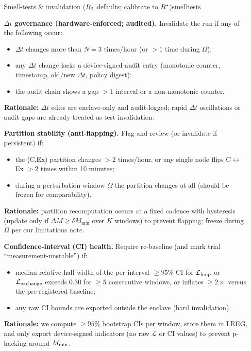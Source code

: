\documentclass[11pt]{article}
\begin{document}
\begin{docbox}{Smell-tests \& invalidation ($R_0$ defaults; calibrate to $R^*$)}{smelltests}

\textbf{$\Delta t$ governance (hardware-enforced; audited).} Invalidate the run if any of the following occur:
\begin{itemize}
\item $\Delta t$ changes more than $N = 3$ times/hour (or $>1$ time during $\Omega$);
\item any $\Delta t$ change lacks a device-signed audit entry (monotonic counter, timestamp, old/new $\Delta t$, policy digest);
\item the audit chain shows a gap $>1$ interval or a non-monotonic counter.
\end{itemize}
\textbf{Rationale:} $\Delta t$ edits are enclave-only and audit-logged; rapid $\Delta t$ oscillations or audit gaps are already treated as test invalidation.

\textbf{Partition stability (anti-flapping).} Flag and review (or invalidate if persistent) if:
\begin{itemize}
\item the (C,Ex) partition changes $>2$ times/hour, or any single node flips C$\leftrightarrow$Ex $>2$ times within 10 minutes;
\item during a perturbation window $\Omega$ the partition changes at all (should be frozen for comparability).
\end{itemize}
\textbf{Rationale:} partition recomputation occurs at a fixed cadence with hysteresis (update only if $\Delta M \geq \delta M_{\min}$ over $K$ windows) to prevent flapping; freeze during $\Omega$ per our limitations note.

\textbf{Confidence-interval (CI) health.} Require re-baseline (and mark trial ``measurement-unstable'') if:
\begin{itemize}
\item median relative half-width of the per-interval $\geq 95\%$ CI for $\mathcal{L}_{\text{loop}}$ or $\mathcal{L}_{\text{exchange}}$ exceeds 0.30 for $\geq 5$ consecutive windows, or inflates $\geq 2\times$ versus the pre-registered baseline;
\item any raw CI bounds are exported outside the enclave (hard invalidation).
\end{itemize}
\textbf{Rationale:} we compute $\geq 95\%$ bootstrap CIs per window, store them in LREG, and only export device-signed indicators (no raw $\mathcal{L}$ or CI values) to prevent p-hacking around $M_{\min}$.


\end{docbox}
\end{document}
